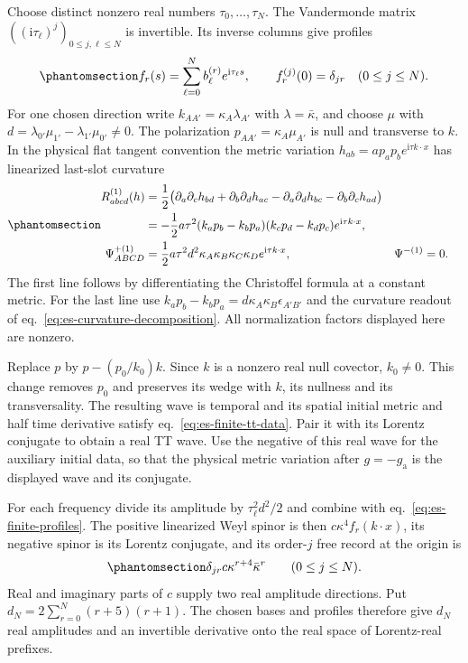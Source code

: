 \documentclass[
  english,
  11pt,
  reqno]{amsart}
\begin{document}
Choose distinct nonzero real numbers \(\tau_0,\ldots,\tau_N\). The
Vandermonde matrix \(((\mathrm i\tau_\ell)^j)_{0\le j,\ell\le N}\) is
invertible. Its inverse columns give profiles
\begin{equation}\protect\phantomsection\label{eq:es-finite-profiles}{
 f_r(s)=\sum_{\ell=0}^N b_\ell^{(r)}e^{\mathrm i\tau_\ell s},
 \qquad f_r^{(j)}(0)=\delta_{jr}\quad(0\le j\le N).
}\end{equation} For one chosen direction write
\(k_{AA'}=\kappa_A\lambda_{A'}\) with \(\lambda=\bar\kappa\), and choose
\(\mu\) with \(d=\lambda_{0'}\mu_{1'}-\lambda_{1'}\mu_{0'}\ne0\). The
polarization \(p_{AA'}=\kappa_A\mu_{A'}\) is null and transverse to
\(k\). In the physical flat tangent convention the metric variation
\(h_{ab}=a p_ap_b e^{\mathrm i\tau k\cdot x}\) has linearized last-slot
curvature
\begin{equation}\protect\phantomsection\label{eq:es-finite-wave-readout}{
 \begin{aligned}
 R^{(1)}_{abcd}(h)
 &=\frac12\bigl(
   \partial_a\partial_ch_{bd}+\partial_b\partial_dh_{ac}
   -\partial_a\partial_dh_{bc}-\partial_b\partial_ch_{ad}\bigr)\\
 &=-\frac12a\tau^2
   (k_ap_b-k_bp_a)(k_cp_d-k_dp_c)e^{\mathrm i\tau k\cdot x},\\
 \Psi^{+(1)}_{ABCD}
 &=\frac12a\tau^2d^2\kappa_A\kappa_B\kappa_C\kappa_D
       e^{\mathrm i\tau k\cdot x},
 &\Psi^{-(1)}&=0.
 \end{aligned}
}\end{equation} The first line follows by differentiating the
Christoffel formula at a constant metric. For the last line use
\(k_ap_b-k_bp_a=d\kappa_A\kappa_B\epsilon_{A'B'}\) and the curvature
readout of eq.~\ref{eq:es-curvature-decomposition}. All normalization
factors displayed here are nonzero.

Replace \(p\) by \(p-(p_0/k_0)k\). Since \(k\) is a nonzero real null
covector, \(k_0\ne0\). This change removes \(p_0\) and preserves its
wedge with \(k\), its nullness and its transversality. The resulting
wave is temporal and its spatial initial metric and half time derivative
satisfy eq.~\ref{eq:es-finite-tt-data}. Pair it with its Lorentz
conjugate to obtain a real TT wave. Use the negative of this real wave
for the auxiliary initial data, so that the physical metric variation
after \(g=-g_{\mathrm a}\) is the displayed wave and its conjugate.

For each frequency divide its amplitude by \(\tau_\ell^2d^2/2\) and
combine with eq.~\ref{eq:es-finite-profiles}. The positive linearized
Weyl spinor is then \(c\kappa^4f_r(k\cdot x)\), its negative spinor is
its Lorentz conjugate, and its order-\(j\) free record at the origin is
\begin{equation}\protect\phantomsection\label{eq:es-finite-wave-record}{
 \delta_{jr}c\kappa^{r+4}\bar\kappa^r
 \qquad(0\le j\le N).
}\end{equation} Real and imaginary parts of \(c\) supply two real
amplitude directions. Put \(d_N=2\sum_{r=0}^N(r+5)(r+1)\). The chosen
bases and profiles therefore give \(d_N\) real amplitudes and an
invertible derivative onto the real space of Lorentz-real prefixes.
\end{document}
